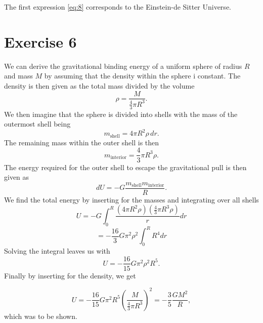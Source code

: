 \documentclass[a4paper]{article}
\begin{document}
The first expression \eqref{eq:8} corresponds to the Einstein-de Sitter Universe.

\section*{Exercise 6}

We can derive the gravitational binding energy of a uniform sphere of radius $R$ and mass $M$ by assuming that the density within the sphere i constant. The density is then given as the total mass divided by the volume
\[
\rho = \frac{M}{\frac{4}{3} \pi R^3}.
\]
We then imagine that the sphere is divided into shells with the mass of the outermost shell being
\[
m_{\text{shell}} = 4\pi R^2 \rho\, dr.
\]
The remaining mass within the outer shell is then
\[
m_{\text{interior}} = \frac{4}{3}\pi R^3 \rho.
\]
The energy required for the outer shell to escape the gravitational pull is then given as
\[
dU = -G\frac{m_{\text{shell}} m_{\text{interior}} }{R}.
\]
We find the total energy by inserting for the masses and integrating over all shells
\[
U = -G \int^R_0 \frac{\left(4\pi R^2 \rho\right)  \left(\frac{4}{3}\pi R^3 \rho \right)}{r} dr
\]
\[
= - \frac{16}{3} G\pi^2 \rho^2 \int_0^R R^4 dr
\]
Solving the integral leaves us with 
\[
U = - \frac{16}{15} G \pi^2 \rho^2 R^5.
\]
Finally by inserting for the density, we get

\[
U = - \frac{16}{15} G \pi^2 R^5 \left(\frac{M}{\frac{4}{3} \pi R^3}\right)^2 = - \frac{3}{5} \frac{GM^2}{R},
\]
which was to be shown.
\end{document}

